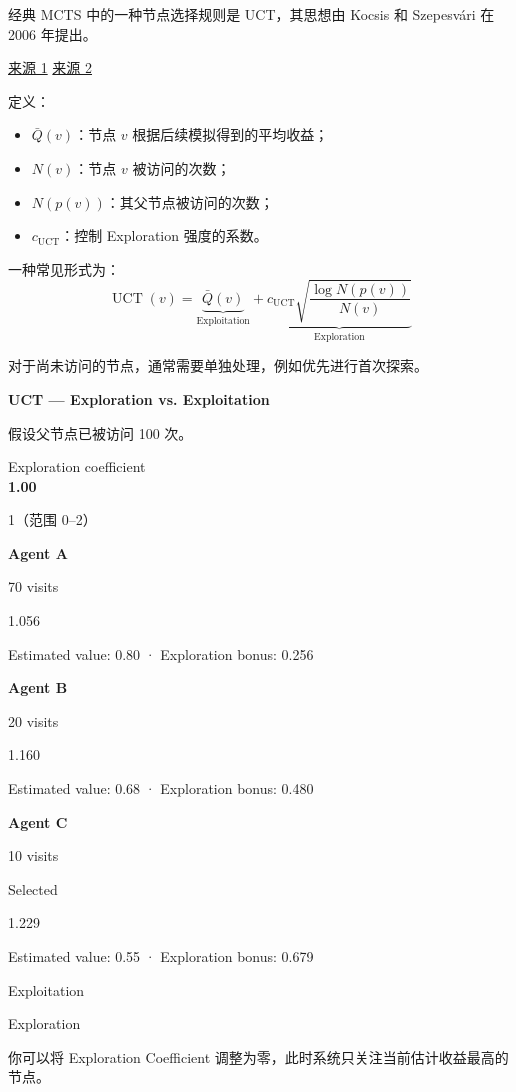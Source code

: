 经典 MCTS 中的一种节点选择规则是 UCT，其思想由 Kocsis 和 Szepesvári 在 2006 年提出。

\href{https://aima.cs.berkeley.edu/~russell/classes/cs294/s11/readings/Kocsis\%2BSzepesvari\%3A2006.pdf}{来源 1} \href{https://cris.technion.ac.il/en/publications/bandit-based-monte-carlo-planning/}{来源 2}

定义：

\begin{itemize}
\tightlist
\item
  \(\bar Q(v)\)：节点 \(v\) 根据后续模拟得到的平均收益；
\item
  \(N(v)\)：节点 \(v\) 被访问的次数；
\item
  \(N(p(v))\)：其父节点被访问的次数；
\item
  \(c_{\mathrm{UCT}}\)：控制 Exploration 强度的系数。
\end{itemize}

一种常见形式为：
\[\boxed{
\operatorname{UCT}(v)
=
\underbrace{\bar Q(v)}_{\text{Exploitation}}
+
\underbrace{
c_{\mathrm{UCT}}
\sqrt{
\frac{\log N(p(v))}{N(v)}
}
}_{\text{Exploration}}
}\]

对于尚未访问的节点，通常需要单独处理，例如优先进行首次探索。

\textbf{UCT --- Exploration vs. Exploitation}

假设父节点已被访问 100 次。

Exploration coefficient\\
\textbf{1.00}

1（范围 0--2）

\textbf{Agent A}

70 visits

1.056

Estimated value: 0.80 · Exploration bonus: 0.256

\textbf{Agent B}

20 visits

1.160

Estimated value: 0.68 · Exploration bonus: 0.480

\textbf{Agent C}

10 visits

Selected

1.229

Estimated value: 0.55 · Exploration bonus: 0.679

Exploitation

Exploration

你可以将 Exploration Coefficient 调整为零，此时系统只关注当前估计收益最高的节点。

